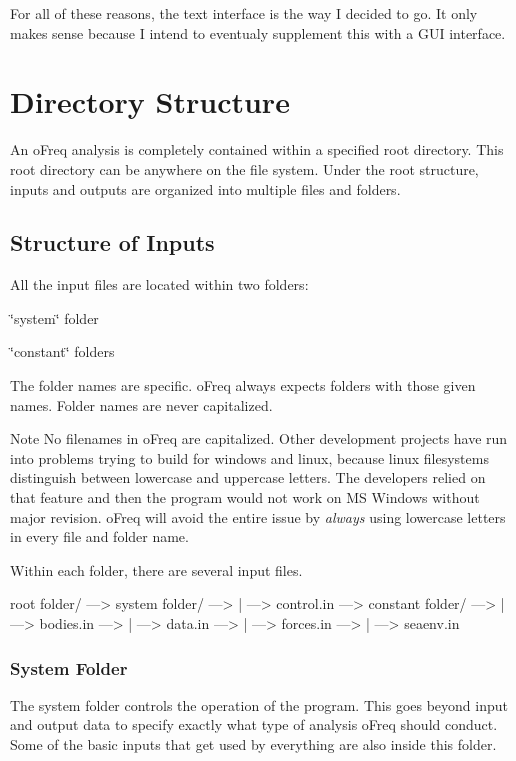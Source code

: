 For all of these reasons, the text interface is the way I decided to go. It only makes sense because I intend to eventualy supplement this with a G\-U\-I interface. \hypertarget{directory_structure}{}\section{Directory Structure}\label{directory_structure}
An o\-Freq analysis is completely contained within a specified root directory. This root directory can be anywhere on the file system. Under the root structure, inputs and outputs are organized into multiple files and folders.\hypertarget{directory_structure_directory_structure_inputs}{}\subsection{Structure of Inputs}\label{directory_structure_directory_structure_inputs}
All the input files are located within two folders\-:


\begin{DoxyEnumerate}
\item \char`\"{}system\char`\"{} folder
\item \char`\"{}constant\char`\"{} folders
\end{DoxyEnumerate}

The folder names are specific. o\-Freq always expects folders with those given names. Folder names are never capitalized.

\begin{DoxyNote}{Note}
No filenames in o\-Freq are capitalized. Other development projects have run into problems trying to build for windows and linux, because linux filesystems distinguish between lowercase and uppercase letters. The developers relied on that feature and then the program would not work on M\-S Windows without major revision. o\-Freq will avoid the entire issue by {\itshape always} using lowercase letters in every file and folder name.
\end{DoxyNote}
Within each folder, there are several input files. \begin{DoxyVerb}root folder/
--->  system folder/
---> | ---> control.in
--->  constant folder/
---> | ---> bodies.in
---> | ---> data.in
---> | ---> forces.in
---> | ---> seaenv.in
\end{DoxyVerb}
\hypertarget{directory_structure_system1}{}\subsubsection{System Folder}\label{directory_structure_system1}
The system folder controls the operation of the program. This goes beyond input and output data to specify exactly what type of analysis o\-Freq should conduct. Some of the basic inputs that get used by everything are also inside this folder.

